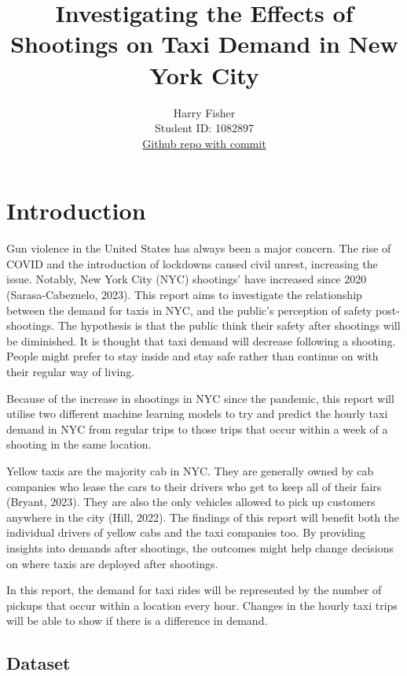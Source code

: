 \documentclass[11pt]{article}
\title{\textbf{Investigating the Effects of Shootings on Taxi Demand in New York City}}
\author{
Harry Fisher \\
Student ID: 1082897 \\
\href{https://github.com/MAST30034-Applied-Data-Science/mast30034-project-1-HFISHER00/commit/ced29bbf7fd3b989f2876ecc9c600d9fccb8a563}{Github repo with commit}
}
\begin{document}
\maketitle

\section{Introduction}

\hspace{0pt}Gun violence in the United States has always been a major concern. The rise of COVID and the introduction of lockdowns caused civil unrest, increasing the issue. Notably, New York City (NYC) shootings’ have increased since 2020 (Sarasa-Cabezuelo, 2023). This report aims to investigate the relationship between the demand for taxis in NYC, and the public’s perception of safety post-shootings. The hypothesis is that the public think their safety after shootings will be diminished. It is thought that taxi demand will decrease following a shooting. People might prefer to stay inside and stay safe rather than continue on with their regular way of living. 

Because of the increase in shootings in NYC since the pandemic, this report will utilise two different machine learning models to try and predict the hourly taxi demand in NYC from regular trips to those trips that occur within a week of a shooting in the same location.

Yellow taxis are the majority cab in NYC. They are generally owned by cab companies who lease the cars to their drivers who get to keep all of their fairs (Bryant, 2023). They are also the only vehicles allowed to pick up customers anywhere in the city (Hill, 2022). The findings of this report will benefit both the individual drivers of yellow cabs and the taxi companies too. By providing insights into demands after shootings, the outcomes might help change decisions on where taxis are deployed after shootings.

In this report, the demand for taxi rides will be represented by the number of pickups that occur within a location every hour. Changes in the hourly taxi trips will be able to show if there is a difference in demand.

\subsection{Dataset}
\end{document}
